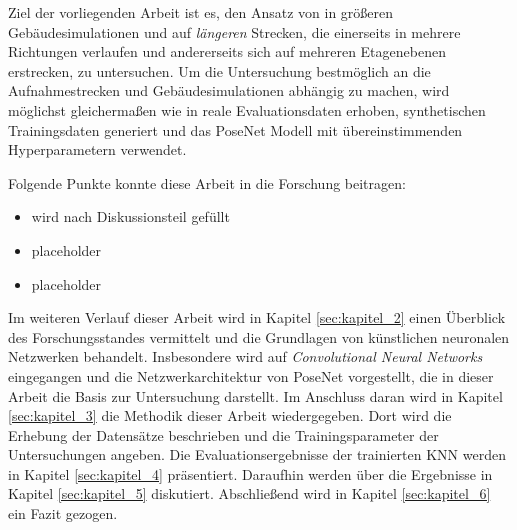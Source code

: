 Ziel der vorliegenden Arbeit ist es, den Ansatz von \citet{acharyaBIMPoseNetIndoorCamera2019} in größeren Gebäudesimulationen und auf \textit{längeren} Strecken, die einerseits in mehrere Richtungen verlaufen und andererseits sich auf mehreren Etagenebenen erstrecken, zu untersuchen. Um die Untersuchung bestmöglich an die Aufnahmestrecken und Gebäudesimulationen abhängig zu machen, wird möglichst gleichermaßen wie in \cite{acharyaBIMPoseNetIndoorCamera2019} reale Evaluationsdaten erhoben, synthetischen Trainingsdaten generiert und das PoseNet Modell mit übereinstimmenden Hyperparametern verwendet.

Folgende Punkte konnte diese Arbeit in die Forschung beitragen:
\begin{itemize}
	\item
	wird nach Diskussionsteil gefüllt
	\item
	placeholder
	\item
	placeholder
\end{itemize}

Im weiteren Verlauf dieser Arbeit wird in Kapitel \ref{sec:kapitel_2} einen Überblick des Forschungsstandes vermittelt und die Grundlagen von künstlichen neuronalen Netzwerken behandelt. Insbesondere wird auf \textit{Convolutional Neural Networks} eingegangen und die Netzwerkarchitektur von PoseNet vorgestellt, die in dieser Arbeit die Basis zur Untersuchung darstellt. Im Anschluss daran wird in Kapitel \ref{sec:kapitel_3} die Methodik dieser Arbeit wiedergegeben. Dort wird die Erhebung der Datensätze beschrieben und die Trainingsparameter der Untersuchungen angeben. Die Evaluationsergebnisse der trainierten KNN werden in Kapitel \ref{sec:kapitel_4} präsentiert. Daraufhin werden über die Ergebnisse in Kapitel \ref{sec:kapitel_5} diskutiert. Abschließend wird in Kapitel \ref{sec:kapitel_6} ein Fazit gezogen. 


